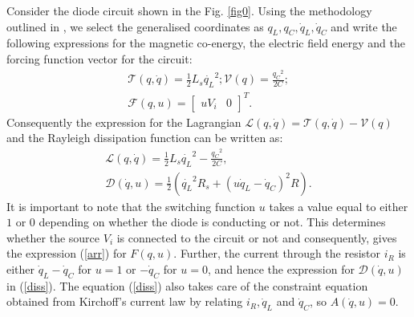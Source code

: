 \documentclass[preprint,12pt]{elsarticle}
\begin{document}

Consider the diode circuit shown in the Fig. \ref{fig0}. Using the methodology outlined in \cite{scherpen_2003}, we select the generalised coordinates as $q_L,q_C,\dot{q}_L,\dot{q}_C$ and write the following expressions for the magnetic co-energy, the electric field energy and the forcing function vector for the circuit:
\begin{eqnarray}
\mathcal{T}(q,\dot{q})=\frac{1}{2}L_s\dot{q_L}^2;\mathcal{V}(q)=\frac{{q_C}^2}{2C};\\
\mathcal{F}(q,u) =\left[\begin{array}{cc}
uV_i & 0 
\end{array}\right]^T.
\label{arr}
\end{eqnarray}
Consequently the expression for the Lagrangian $\mathcal{L}(q,\dot{q})=\mathcal{T}(q,\dot{q})-\mathcal{V}(q)$ and the Rayleigh dissipation function can be written as:
\begin{eqnarray}\label{eel}
\mathcal{L}(q,\dot{q})=\frac{1}{2}L_s\dot{q_L}^2-\frac{{{q}_C}^2}{2C},\\ 
\mathcal{D}(\dot{q},u)=\frac{1}{2}(\dot{q_L}^2R_s+(u\dot{q}_L-\dot{q}_C)^2R).
\label{diss}
\end{eqnarray}
It is important to note that the switching function $u$ takes a value equal to either $1$ or $0$ depending on whether the diode is conducting or not. This determines whether the source $V_i$ is connected to the circuit or not and consequently, gives the expression (\ref{arr}) for ${F}(q,u)$. Further, the current through the resistor $i_R$ is either $\dot{q}_L-\dot{q}_C$ for $u=1$ or $-\dot{q}_C$ for $u=0$, and hence the expression for $\mathcal{D}(\dot{q},u)$ in (\ref{diss}). The equation (\ref{diss}) also takes care of the constraint equation obtained from Kirchoff's current law by relating $i_R,\dot{q}_L$ and $\dot{q}_C$, so $A(\dot{q},u)=0$.
\end{document}
